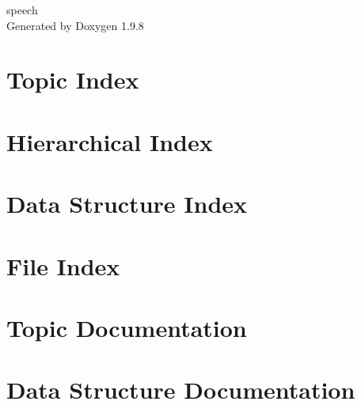 \documentclass[twoside]{book}
\newcommand{\+}{\discretionary{\mbox{\scriptsize$\hookleftarrow$}}{}{}}
\newcommand{\clearemptydoublepage}{%
    \newpage{\pagestyle{empty}\cleardoublepage}%
  }
\begin{document}
  \raggedbottom
  \begin{titlepage}
  \vspace*{7cm}
  \begin{center}%
  {\Large speech}\\
  \vspace*{1cm}
  {\large Generated by Doxygen 1.9.8}\\
  \end{center}
  \end{titlepage}
  \clearemptydoublepage
  \tableofcontents
  \clearemptydoublepage








\chapter{Topic Index}

\chapter{Hierarchical Index}

\chapter{Data Structure Index}

\chapter{File Index}

\chapter{Topic Documentation}




\chapter{Data Structure Documentation}

\end{document}
